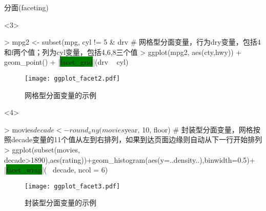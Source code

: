 \begin{frame}[t,fragile]{\subsecname}{分面(faceting)}
\begin{overlayarea}{\textwidth}{\textheight}
\begin{onlyenv}<3>
\begin{minipage}{\textwidth}
\begin{rcode}
> mpg2 <- subset(mpg, cyl != 5 & drv %
# 网格型分面变量，行为dry变量，包括4和f两个值；列为cyl变量，包括4,6,8三个值
> ggplot(mpg2, aes(cty,hwy)) + geom_point() + |\colorbox{green}{facet\_grid}|(drv ~ cyl)
\end{rcode}
\end{minipage}
\begin{minipage}{\textwidth}
\begin{figure}
\centering
\texttt{[image: ggplot\_facet2.pdf]}
\caption{网格型分面变量的示例}
\end{figure}
\end{minipage}
\end{onlyenv}

\begin{onlyenv}<4>
\begin{minipage}{\textwidth}
\begin{rcode}
> movies$decade <- round_any(movies$year, 10, floor)
# 封装型分面变量，网格按照decade变量的11个值从左到右排列，如果到达页面边缘则自动从下一行开始排列
> ggplot(subset(movies, decade>1890),aes(rating))+geom_histogram(aes(y=..density..),binwidth=0.5)+ 
     |\colorbox{green}{facet\_wrap}|(~ decade, ncol = 6)
\end{rcode}
\end{minipage}
\begin{minipage}{\textwidth}
\begin{figure}
\centering
\texttt{[image: ggplot\_facet3.pdf]}
\caption{封装型分面变量的示例}
\end{figure}
\end{minipage}
\end{onlyenv}



\end{overlayarea}
\end{frame}
